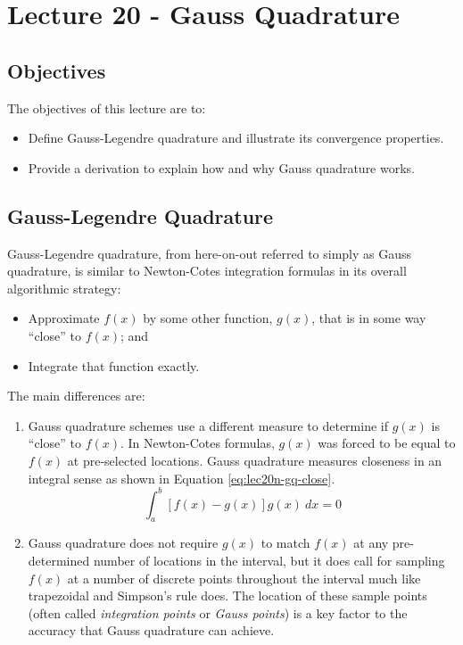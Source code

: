 \chapter{Lecture 20 - Gauss Quadrature}
\label{ch:lec20n}
\section{Objectives}
The objectives of this lecture are to:
\begin{itemize}
\item Define Gauss-Legendre quadrature and illustrate its convergence properties.
\item Provide a derivation to explain how and why Gauss quadrature works. 
\end{itemize}
\setcounter{lstannotation}{0}

\section{Gauss-Legendre Quadrature}
Gauss-Legendre quadrature, from here-on-out referred to simply as Gauss quadrature, is similar to Newton-Cotes integration formulas in its overall algorithmic strategy:
\begin{itemize}
\item Approximate $f(x)$ by some other function, $g(x)$, that is in some way ``close'' to $f(x)$; and
\item Integrate that function exactly.
\end{itemize}
The main differences are:
\begin{enumerate}
\item Gauss quadrature schemes use a different measure to determine if $g(x)$ is ``close'' to $f(x)$.  In Newton-Cotes formulas, $g(x)$ was forced to be equal to $f(x)$ at pre-selected locations.  Gauss quadrature measures closeness in an integral sense as shown in Equation \ref{eq:lec20n-gq-close}.
\begin{equation}
\int_{a}^{b}\left[f(x) - g(x)\right]g(x) \ dx = 0
\label{eq:lec20n-gq-close}
\end{equation}
\item Gauss quadrature does not require $g(x)$ to match $f(x)$ at any pre-determined number of locations in the interval, but it does call for sampling $f(x)$ at a number of discrete points throughout the interval much like trapezoidal and Simpson's rule does.  The location of these sample points (often called \emph{integration points} or \emph{Gauss points}) is a key factor to the accuracy that Gauss quadrature can achieve.
\end{enumerate}


